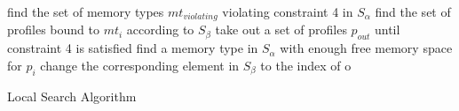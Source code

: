 \setlength{\textfloatsep}{0.2cm}
\begin{algorithm2e}[htb]
		find the set of memory types $mt_{violating}$ violating constraint 4 in $S_{\alpha}$\;
		{
			find the set of profiles bound to $mt_{i}$ according to $S_{\beta}$\;
			take out a set of profiles $p_{out}$ until constraint 4 is satisfied\;
			{
				find a memory type in $S_{\alpha}$ with enough free memory space for $p_{i}$\;
				change the corresponding element in $S_{\beta}$ to the index of 
			}
		}
		o
		
		
	\caption{Local Search Algorithm}
	\label{algo:local_search}
\end{algorithm2e}
\setlength{\textfloatsep}{0.2cm}